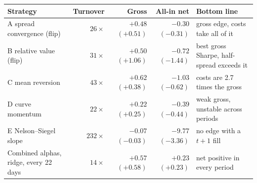 \begin{tabular}{@{}l r r r l@{}}
\toprule
Strategy & Turnover & Gross & All-in net & Bottom line \\
\midrule
A spread convergence (flip) & $26\times$ & $+0.48$ $(+0.51)$ & $-0.30$ $(-0.31)$ & gross edge, costs take all of it \\
B relative value (flip) & $31\times$ & $+0.50$ $(+1.06)$ & $-0.72$ $(-1.44)$ & best gross Sharpe, half-spread exceeds it \\
C mean reversion & $43\times$ & $+0.62$ $(+0.38)$ & $-1.03$ $(-0.62)$ & costs are 2.7 times the gross \\
D curve momentum & $22\times$ & $+0.22$ $(+0.25)$ & $-0.39$ $(-0.44)$ & weak gross, unstable across periods \\
E Nelson--Siegel slope & $232\times$ & $-0.07$ $(-0.03)$ & $-9.77$ $(-3.36)$ & no edge with a $t+1$ fill \\
\midrule
Combined alphas, ridge, every 22 days & $14\times$ & $+0.57$ $(+0.58)$ & $+0.23$ $(+0.23)$ & net positive in every period \\
\bottomrule
\end{tabular}
